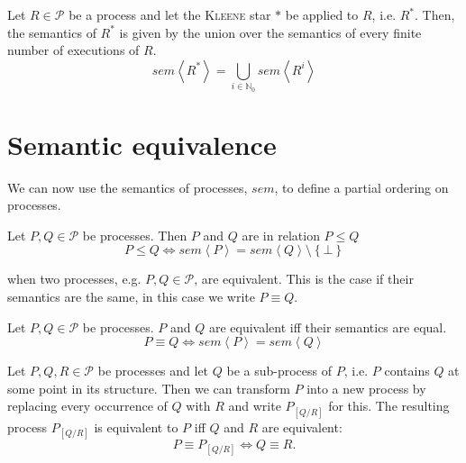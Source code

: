 \begin{definition}
\label{def:sem_kleene_alternative}
  Let $R \in \mathcal{P}$ be a process and let the \textsc{Kleene} star $*$ be applied to $R$, i.e. $R^*$. Then, the semantics of $R^*$ is given by the union over the semantics of every finite number of executions of $R$.
  \begin{equation}
    \label{eqn:sem_kleene_alternative}
    sem \left\langle R^* \right\rangle = \bigcup_{i \in \mathbb{N}_0} sem \left\langle R^i \right\rangle
  \end{equation}
  \hfill\qedsymbol
\end{definition}


\section{Semantic equivalence}
We can now use the semantics of processes, $sem$, to define a partial ordering on processes.
\begin{definition}
Let $P, Q \in \mathcal{P}$ be processes. Then $P$ and $Q$ are in relation $P \leq Q$
  \begin{equation}
    P \leq Q \Leftrightarrow sem \left\langle P \right\rangle = sem \left\langle Q \right\rangle \setminus \left\{ \bot \right\}
  \end{equation}
\end{definition}





when two processes, e.g. $P, Q \in \mathcal{P}$, are equivalent. This is the case if their semantics are the same, in this case we write $P \equiv Q$.
\begin{definition}
Let $P, Q \in \mathcal{P}$ be processes. $P$ and $Q$ are equivalent iff their semantics are equal.
  \begin{equation}
    \label{eqn:equivalence}
    P \equiv Q \Leftrightarrow sem \left\langle P \right\rangle = sem \left\langle Q \right\rangle
  \end{equation}
  \hfill\qedsymbol
\end{definition}

\begin{definition}
\label{def:process_substitution}
Let $P, Q, R \in \mathcal{P}$ be processes and let $Q$ be a sub-process of $P$, i.e. $P$ contains $Q$ at some point in its structure. Then we can transform $P$ into a new process by replacing every occurrence of $Q$ with $R$ and write $P_{\left[ Q / R \right]}$ for this. The resulting process $P_{\left[ Q / R \right]}$ is equivalent to $P$ iff $Q$ and $R$ are equivalent:
  \begin{equation}
    P \equiv P_{\left[ Q / R \right]} \Leftrightarrow Q \equiv R.
  \end{equation}
  \hfill\qedsymbol
\end{definition}

